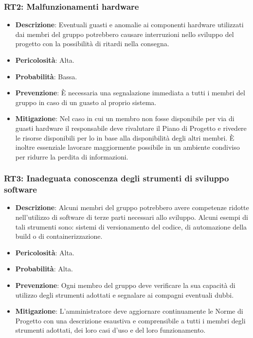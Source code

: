 \subsubsection{RT2: Malfunzionamenti hardware}
\begin{itemize}
    \item \textbf{Descrizione}: Eventuali guasti e anomalie ai componenti hardware utilizzati dai membri del gruppo potrebbero causare 
    interruzioni nello sviluppo del progetto con la possibilità di ritardi nella consegna.
    \item \textbf{Pericolosità}: Alta.
    \item \textbf{Probabilità}: Bassa.
    \item \textbf{Prevenzione}: È necessaria una segnalazione immediata a tutti i membri del gruppo in caso di un guasto al proprio sistema.
    \item \textbf{Mitigazione}: Nel caso in cui un membro non fosse disponibile per via di guasti hardware il responsabile deve  rivalutare il Piano di Progetto e rivedere le risorse disponibili per lo  in base alla disponibilità degli altri membri.
    È inoltre essenziale lavorare maggiormente possibile in un ambiente condiviso per ridurre la perdita di informazioni.
\end{itemize}

\subsubsection{RT3: Inadeguata conoscenza degli strumenti di sviluppo software}
\begin{itemize}
    \item \textbf{Descrizione}: Alcuni membri del gruppo potrebbero avere competenze ridotte nell'utilizzo di software di terze parti necessari allo sviluppo.
    Alcuni esempi di tali strumenti sono: sistemi di versionamento del codice, di automazione della build o di containerizzazione. 
    \item \textbf{Pericolosità}: Alta.
    \item \textbf{Probabilità}: Alta.
    \item \textbf{Prevenzione}: Ogni membro del gruppo deve verificare la sua capacità di utilizzo degli strumenti adottati e segnalare ai compagni eventuali dubbi.
    \item \textbf{Mitigazione}: L'amministratore deve aggiornare continuamente le Norme di Progetto con una descrizione esaustiva e comprensibile a tutti i membri degli strumenti adottati, dei loro casi d'uso e del loro funzionamento.
\end{itemize}

